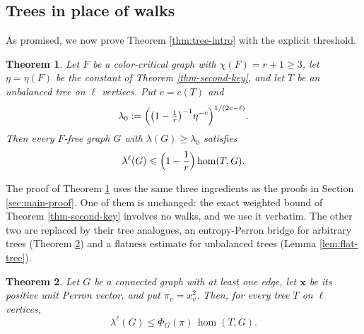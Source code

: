 \documentclass[11pt, a4paper]{article}
\newtheorem{theorem}{Theorem}[section]
\theoremstyle{definition}
\theoremstyle{plain}
\renewcommand{\le}{\leqslant}
\renewcommand{\ge}{\geqslant}
\newcommand{\PhiG}{\Phi_G}
\begin{document}
\subsection{Trees in place of walks}

\label{subsec:trees}

As promised, we now prove Theorem \ref{thm:tree-intro} with the explicit threshold.  




\begin{theorem}\label{thm:spectral-tree}
Let $F$ be a color-critical graph with $\chi (F)=r+1\ge 3$, let $\eta =\eta (F)$ be the constant of Theorem \ref{thm-second-key}, and
let $T$ be an unbalanced tree on $\ell$ vertices. Put $c=c(T)$ and 
\[
  \lambda_0 :=\Bigl(\bigl(1-\tfrac1r\bigr)^{-1}
    \eta^{-c}\Bigr)^{1/(2c-\ell)}.
\]
Then every $F$-free graph $G$ with
$\lambda (G)\ge \lambda_0$ satisfies
\[
  \lambda^\ell (G)\le
  \Bigl(1-\frac1r\Bigr)\hom (T,G).
\]
\end{theorem}


The proof of Theorem \ref{thm:spectral-tree} uses the same three ingredients as the proofs in Section \ref{sec:main-proof}.
One of them is unchanged: the exact weighted bound of Theorem \ref{thm-second-key} involves no walks, and we use it verbatim. 
The other two are replaced by their tree analogues,
an entropy-Perron bridge for arbitrary trees (Theorem \ref{thm-tree-bridge}) and a flatness estimate for unbalanced trees  (Lemma \ref{lem:flat-tree}).



\begin{theorem} 
\label{thm-tree-bridge}
Let $G$ be a connected graph with at least one edge,
let $\bm{x}$ be its positive unit Perron vector, and put
$\pi_v=x_v^2$. Then, for every tree $T$ on $\ell$
vertices,
\[
  \lambda^\ell (G) \le \PhiG(\pi)\,\hom (T,G).
\]
\end{theorem}
\end{document}

